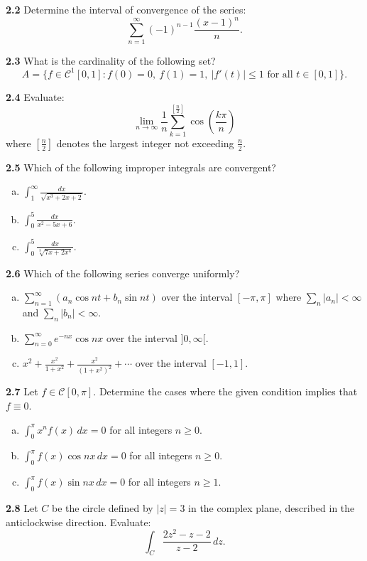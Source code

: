 \documentclass[11pt,a4paper]{article}
\newcommand{\qitem}[1]{\par\medskip\noindent\textbf{#1}\hspace{0.5em}}
\begin{document}
\qitem{2.2} Determine the interval of convergence of the series:
\[
  \sum_{n=1}^{\infty} (-1)^{n-1} \frac{(x-1)^n}{n}.
\]

\qitem{2.3} What is the cardinality of the following set?
\[
  A = \{f \in \mathcal{C}^1[0, 1] : f(0) = 0,\ f(1) = 1,\ |f'(t)| \le 1 \text{ for all } t \in [0, 1]\}.
\]

\qitem{2.4} Evaluate:
\[
  \lim_{n \to \infty} \frac{1}{n} \sum_{k=1}^{\left[\frac{n}{2}\right]} \cos\left(\frac{k\pi}{n}\right)
\]
where $\left[\frac{n}{2}\right]$ denotes the largest integer not exceeding $\frac{n}{2}$.

\qitem{2.5} Which of the following improper integrals are convergent?
\begin{enumerate}[a.]
  \item $\displaystyle\int_1^{\infty} \frac{dx}{\sqrt{x^3 + 2x + 2}}$.
  \item $\displaystyle\int_0^5 \frac{dx}{x^2 - 5x + 6}$.
  \item $\displaystyle\int_0^5 \frac{dx}{\sqrt[3]{7x + 2x^4}}$.
\end{enumerate}

\qitem{2.6} Which of the following series converge uniformly?
\begin{enumerate}[a.]
  \item $\displaystyle\sum_{n=1}^{\infty} (a_n \cos nt + b_n \sin nt)$ over the interval $[-\pi, \pi]$ where $\sum_n |a_n| < \infty$ and $\sum_n |b_n| < \infty$.
  \item $\displaystyle\sum_{n=0}^{\infty} e^{-nx} \cos nx$ over the interval $]0, \infty[$.
  \item $\displaystyle x^2 + \frac{x^2}{1+x^2} + \frac{x^2}{(1+x^2)^2} + \cdots$ over the interval $[-1, 1]$.
\end{enumerate}

\qitem{2.7} Let $f \in \mathcal{C}[0, \pi]$. Determine the cases where the given condition implies that $f \equiv 0$.
\begin{enumerate}[a.]
  \item $\displaystyle\int_0^{\pi} x^n f(x)\,dx = 0$ for all integers $n \ge 0$.
  \item $\displaystyle\int_0^{\pi} f(x) \cos nx\,dx = 0$ for all integers $n \ge 0$.
  \item $\displaystyle\int_0^{\pi} f(x) \sin nx\,dx = 0$ for all integers $n \ge 1$.
\end{enumerate}

\qitem{2.8} Let $C$ be the circle defined by $|z| = 3$ in the complex plane, described in the anticlockwise direction. Evaluate:
\[
  \int_C \frac{2z^2 - z - 2}{z - 2}\,dz.
\]
\end{document}

